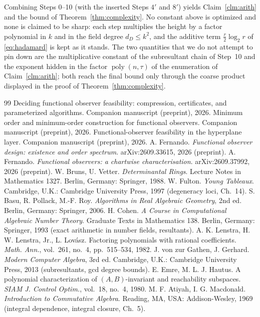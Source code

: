 \documentclass[journal]{IEEEtran}
\theoremstyle{plainn}
\theoremstyle{remark}
\newcommand{\poly}{\operatorname{poly}}
\begin{document}
Combining Steps 0--10 (with the inserted Steps $4'$ and $8'$) yields Claim~\ref{clm:arith} and the bound of
Theorem~\ref{thm:complexity}. No constant above is optimized and none is claimed to be sharp: each step
multiplies the height by a factor polynomial in $k$ and in the field degree $d_D\le k^2$, and the
additive term $\tfrac{r}{2}\log_2 r$ of \eqref{eq:hadamard} is kept as it stands. The two
quantities that we do not attempt to pin down are the multiplicative constant of the subresultant chain of
Step~10 and the exponent hidden in the factor $\poly(n,\tau)$ of the enumeration of
Claim~\ref{clm:arith}; both reach the final bound only through the coarse product displayed in the proof of
Theorem~\ref{thm:complexity}.

\normalsize

\begin{thebibliography}{99}
 Deciding functional observer feasibility: compression, certificates, and
parameterized algorithms. Companion manuscript (preprint), 2026.
 Minimum order and minimum-order construction for functional observers. Companion
manuscript (preprint), 2026.
 Functional-observer feasibility in the hyperplane layer. Companion manuscript
(preprint), 2026.
 A. Fernando. \emph{Functional observer design: existence and order spectrum}.
arXiv:2609.33615, 2026 (preprint).
 A. Fernando. \emph{Functional observers: a chartwise characterisation}. arXiv:2609.37992,
2026 (preprint).
 W. Bruns, U. Vetter. \emph{Determinantal Rings}. Lecture Notes in Mathematics 1327.
Berlin, Germany: Springer, 1988.
 W. Fulton. \emph{Young Tableaux}. Cambridge, U.K.: Cambridge University Press, 1997
(degeneracy loci, Ch.~14).
 S. Basu, R. Pollack, M.-F. Roy. \emph{Algorithms in Real Algebraic Geometry}, 2nd ed.
Berlin, Germany: Springer, 2006.
 H. Cohen. \emph{A Course in Computational Algebraic Number Theory}. Graduate Texts in
Mathematics 138. Berlin, Germany: Springer, 1993 (exact arithmetic in number fields, resultants).
 A. K. Lenstra, H. W. Lenstra, Jr., L. Lovász. Factoring polynomials with rational
coefficients. \emph{Math. Ann.}, vol.~261, no.~4, pp.~515--534, 1982.
 J. von zur Gathen, J. Gerhard. \emph{Modern Computer Algebra}, 3rd ed. Cambridge, U.K.:
Cambridge University Press, 2013 (subresultants, gcd degree bounds).
 E. Emre, M. L. J. Hautus. A polynomial characterization of $(A,B)$-invariant and
reachability subspaces. \emph{SIAM J. Control Optim.}, vol.~18, no.~4, 1980.
 M. F. Atiyah, I. G. Macdonald. \emph{Introduction to Commutative Algebra}.
Reading, MA, USA: Addison-Wesley, 1969 (integral dependence, integral closure, Ch.~5).
\end{thebibliography}
\end{document}
